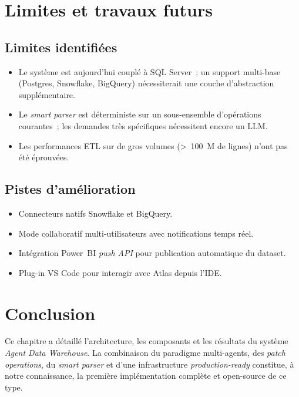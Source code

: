 \documentclass[12pt, a4paper]{report}
\begin{document}
\section{Limites et travaux futurs}

\subsection{Limites identifiées}
\begin{itemize}
  \item Le système est aujourd'hui couplé à SQL Server~; un support
        multi-base (Postgres, Snowflake, BigQuery) nécessiterait
        une couche d'abstraction supplémentaire.
  \item Le \emph{smart parser} est déterministe sur un sous-ensemble
        d'opérations courantes~; les demandes très spécifiques
        nécessitent encore un \ac{LLM}.
  \item Les performances ETL sur de gros volumes (>~100~M de lignes)
        n'ont pas été éprouvées.
\end{itemize}

\subsection{Pistes d'amélioration}
\begin{itemize}
  \item Connecteurs natifs Snowflake et BigQuery.
  \item Mode collaboratif multi-utilisateurs avec notifications
        temps réel.
  \item Intégration Power~BI \emph{push API} pour publication
        automatique du dataset.
  \item Plug-in VS Code pour interagir avec Atlas depuis l'IDE.
\end{itemize}

\section{Conclusion}
Ce chapitre a détaillé l'architecture, les composants et les résultats
du système \emph{Agent Data Warehouse}. La combinaison du paradigme
multi-agents, des \emph{patch operations}, du \emph{smart parser}
et d'une infrastructure \emph{production-ready} constitue, à notre
connaissance, la première implémentation complète et open-source de
ce type.

\cleardoublepage

\end{document}
